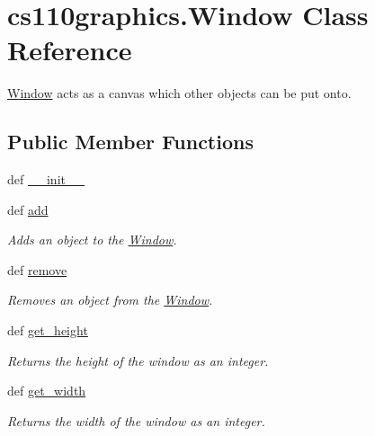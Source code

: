 \hypertarget{classcs110graphics_1_1Window}{
\section{cs110graphics.Window Class Reference}
\label{classcs110graphics_1_1Window}
}


\hyperlink{classcs110graphics_1_1Window}{Window} acts as a canvas which other objects can be put onto.  
\subsection*{Public Member Functions}
\begin{DoxyCompactItemize}
\item 
def \hyperlink{classcs110graphics_1_1Window_af926549e3d731847886302fa390f2863}{\_\-\_\-init\_\-\_\-}
\item 
def \hyperlink{classcs110graphics_1_1Window_a34064de02d5149841a23764e78085d18}{add}
\begin{DoxyCompactList}\small\item\em Adds an object to the \hyperlink{classcs110graphics_1_1Window}{Window}. \item\end{DoxyCompactList}\item 
def \hyperlink{classcs110graphics_1_1Window_a14aba875d32f8a70a0c5a80ac3f18a92}{remove}
\begin{DoxyCompactList}\small\item\em Removes an object from the \hyperlink{classcs110graphics_1_1Window}{Window}. \item\end{DoxyCompactList}\item 
def \hyperlink{classcs110graphics_1_1Window_a2ab7070110bd58c95e8f29c10d71c7cc}{get\_\-height}
\begin{DoxyCompactList}\small\item\em Returns the height of the window as an integer. \item\end{DoxyCompactList}\item 
def \hyperlink{classcs110graphics_1_1Window_a41d27bb09f5033f0596af9f1a3a9b519}{get\_\-width}
\begin{DoxyCompactList}\small\item\em Returns the width of the window as an integer. \item\end{DoxyCompactList}\item 

\end{DoxyCompactItemize}
